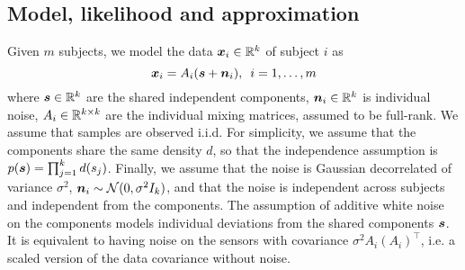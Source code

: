\subsection{Model, likelihood and approximation}
%
Given $m$ subjects, we model the data $\boldsymbol{x}_i\in\mathbb{R}^k$ of subject $i$ as
\begin{equation}
\label{eq:ica_model}
    \boldsymbol{x}_i = A_i(\boldsymbol{s} + \boldsymbol{n}_i), \enspace i=1,\dots, m
\end{equation}
where $\boldsymbol{s} \in \mathbb{R}^k$ are the shared independent components, $\boldsymbol{n}_i \in \mathbb{R}^k$ is individual noise, $A_i \in \mathbb{R}^{k\times k}$ are the individual mixing matrices, assumed to be full-rank.
%
We assume that samples are observed i.i.d. For simplicity, we assume that the components share the same density $d$, so that the independence assumption is $p(\boldsymbol{s}) = \prod_{j=1}^k d(s_j)$. Finally, we assume that the noise is Gaussian decorrelated of variance $\sigma^2$, $\boldsymbol{n}_i \sim \mathcal{N}(0, \sigma^2I_k)$, and that the noise is independent across subjects and independent from the components.
The assumption of additive white noise on the components models individual deviations from the shared components $\boldsymbol{s}$.
It is equivalent to having noise on the sensors with covariance $\sigma^2 A_i \left(A_i\right)^{\top}$, i.e. a scaled version of the data covariance without noise.

